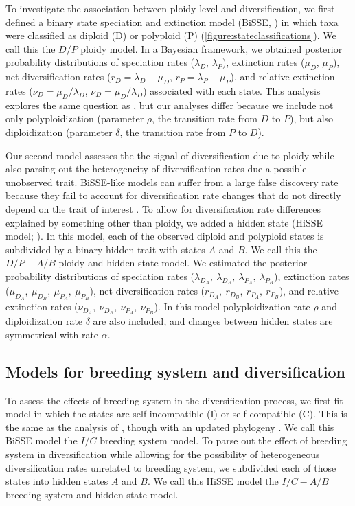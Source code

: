 To investigate the association between ploidy level and diversification, we first defined a binary state speciation and extinction model (BiSSE, \citealt{maddison_2007}) in which taxa were classified as diploid (D) or polyploid (P) (\cref{figure:stateclassifications}).
We call this the $D/P$ ploidy model. 
In a Bayesian framework, we obtained posterior probability distributions of speciation rates ($\lambda_D$, $\lambda_P$), extinction rates ($\mu_D$, $\mu_P$), net diversification rates ($r_D=\lambda_D-\mu_D$, $r_P=\lambda_P-\mu_P$), and relative extinction rates ($\nu_D=\mu_D / \lambda_D$, $\nu_D=\mu_D / \lambda_D$) associated with each state.
This analysis explores the same question as \citet{mayrose_2011, mayrose_2015}, but our analyses differ because we include not only polyploidization (parameter $\rho$, the transition rate from $D$ to $P$), but also diploidization (parameter $\delta$, the transition rate from $P$ to $D$). %

Our second model assesses the the signal of diversification due to ploidy while also parsing out the heterogeneity of diversification rates due a possible unobserved trait.
BiSSE-like models can suffer from a large false discovery rate because they fail to account for diversification rate changes that do not directly depend on the trait of interest \citep{rabosky_2015, beaulieu_2016}.
To allow for diversification rate differences explained by something other than ploidy, we added a hidden state (HiSSE model; \citealt{beaulieu_2016}).
In this model, each of the observed diploid and polyploid states is subdivided by a binary hidden trait with states $A$ and $B$.
We call this the $D/P-A/B$ ploidy and hidden state model. 
We estimated the posterior probability distributions of speciation rates ($\lambda_{D_A},\ \lambda_{D_B},\ \lambda_{P_A},\ \lambda_{P_B}$), extinction rates ($\mu_{D_A},\ \mu_{D_B},\ \mu_{P_A},\ \mu_{P_B}$), net diversification rates ($r_{D_A},\ r_{D_B},\ r_{P_A},\ r_{P_B}$), and relative extinction rates ($\nu_{D_A},\ \nu_{D_B},\ \nu_{P_A},\ \nu_{P_B}$).
In this model polyploidization rate $\rho$ and diploidization rate $\delta$ are also included, and changes between hidden states are symmetrical with rate $\alpha$.

\subsection{Models for breeding system and diversification}

To assess the effects of breeding system in the diversification process, we first fit model in which the states are self-incompatible (I) or self-compatible (C).
This is the same as the analysis of \citet{goldberg_2010}, though with an updated phylogeny \citep{sarkinen_2013}.
We call this BiSSE model the $I/C$ breeding system model. 
To parse out the effect of breeding system in diversification while allowing for the possibility of heterogeneous diversification rates unrelated to breeding system, we subdivided each of those states into hidden states $A$ and $B$.
We call this HiSSE model the $I/C-A/B$ breeding system and hidden state model. 

